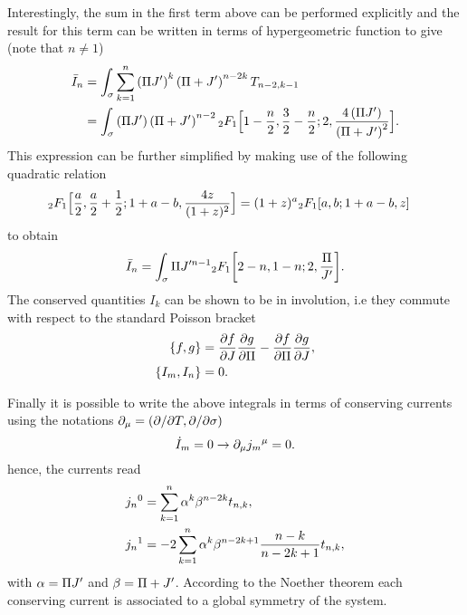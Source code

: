 \documentclass[12pt]{article}%
\numberwithin{equation}{section}
\begin{document}
Interestingly, the sum in the first term above can be performed explicitly and the result for this term can be written in terms of hypergeometric function to give (note that $n\neq 1$)
\begin{equation}
\begin{aligned}
\bar{I}_n&=\int_\sigma \sum_{k=1}^n\left(\Pi J'\right)^k \left(\Pi+J'\right)^{n-2k}T_{n-2,k-1}\\
&=\int_\sigma \left(\Pi J'\right) \left(\Pi+J'\right)^{n-2}{}_2F_1\Big[1-\frac n2, \frac32-\frac n2;2,\frac{4\left(\Pi J'\right)}{\left(\Pi+J'\right)^2}\Big].
\end{aligned}
\end{equation}
This expression can be further simplified by making use of the following quadratic relation
\begin{equation}
\begin{aligned}
{}_2F_1\Big[\frac a2,\frac a2+\frac12;1+a-b,\frac{4z}{(1+z)^2}\Big]&=(1+z)^a{}_2F_1[a,b;1+a-b,z]
\end{aligned}
\end{equation}
to obtain
\begin{equation}
\bar{I}_n=\int_\sigma \Pi J'^{n-1}{}_2F_1\bigg[2-n,1-n;2,\frac{\Pi}{J'}\bigg].
\end{equation}
The conserved quantities $I_k$ can be shown to be in involution, i.e they commute with respect to the standard Poisson bracket
\begin{equation}
\begin{aligned}
\{f,g\}&=\frac{\partial f}{\partial J}\frac{\partial g}{\partial \Pi}-\frac{\partial f}{\partial \Pi}\frac{\partial g}{\partial J},\\
\{I_m,I_n\}&=0.
\end{aligned}
\end{equation}


Finally it is possible to write the above integrals in terms of conserving currents using the notations $\partial_\mu = (\partial/\partial T, \partial/\partial \sigma)$
\begin{equation}
 \label{7.1}
 \dot{I}_{m}=0 \rightarrow \partial_\mu {j_m}^\mu=0.
\end{equation}
hence, the currents read
\begin{equation}
 \label{7.2}
\begin{aligned}
   {j_{n}}^0&=\sum_{k=1}^n\alpha^k\beta^{n-2k}t_{n,k},\\
   {j_{n}}^1&=-2\sum_{k=1}^n\alpha^k\beta^{n-2k+1}\frac{n-k}{n-2k+1}t_{n,k},
\end{aligned}
\end{equation}
with $\alpha=\Pi J'$ and $\beta=\Pi+J'$. According to the Noether theorem each conserving current is associated to a global symmetry of the system.
\end{document}
